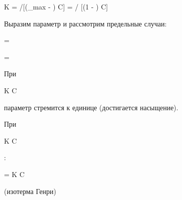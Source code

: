\documentclass[a4paper]{article}
\begin{document}
\begin{center}
\begin{mathmode}

\LARGE K = \Gamma /[(\Gamma_{max} - \Gamma) \cdot C] = \Theta / [(1 - \Theta) \cdot C]


\end{mathmode}
\end{center}

\par 
\vspace{0.3 cm}

Выразим параметр и рассмотрим предельные случаи:

\par 
\vspace{0.3 cm}

\begin{center}
\begin{mathmode}

\LARGE \Theta = 


\end{mathmode}
\end{center}

\par 
\vspace{0.3 cm}

\begin{center}
\begin{mathmode}

\LARGE \Theta = 


\end{mathmode}
\end{center}

При \begin{mathmode} K C  \end{mathmode} параметр стремится к единице (достигается насыщение).
\par \vspace{0.3 cm}

При \begin{mathmode} K C  \end{mathmode}:
\par \vspace{0.3 cm}

\begin{center}
\begin{mathmode}

\LARGE \Theta = K \cdot C

\end{mathmode}

\par \vspace{0.3 cm}
(изотерма Генри)
\end{center}
\end{document}
